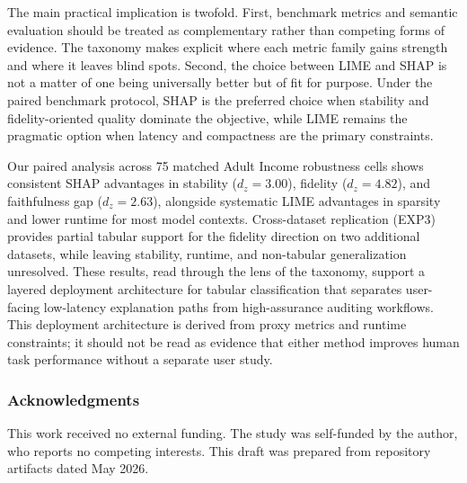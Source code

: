 \documentclass[10pt]{article}
\makeatletter
\newcommand{\ifdeanon}[2]{\if@accepted#1\else#2\fi}
\newcommand{\acks}[1]{\subsubsection*{Acknowledgments}#1}
\makeatother
\begin{document}
The main practical implication is twofold. First, benchmark metrics and
semantic evaluation should be treated as complementary rather than
competing forms of evidence. The taxonomy makes explicit where each
metric family gains strength and where it leaves blind spots. Second, the
choice between LIME and SHAP is not a matter of one being universally
better but of fit for purpose. Under the paired benchmark protocol, SHAP
is the preferred choice when stability and fidelity-oriented quality
dominate the objective, while LIME remains the pragmatic option when
latency and compactness are the primary constraints.

Our paired analysis across 75 matched Adult Income robustness cells shows
consistent SHAP advantages in stability ($d_z = 3.00$), fidelity
($d_z = 4.82$), and faithfulness gap ($d_z = 2.63$), alongside systematic
LIME advantages in sparsity and lower runtime for most model contexts.
Cross-dataset replication (EXP3) provides partial tabular support for the
fidelity direction on two additional datasets, while leaving stability,
runtime, and non-tabular generalization unresolved. These results, read
through the lens of the taxonomy, support a layered deployment
architecture for tabular classification that separates user-facing
low-latency explanation paths from high-assurance auditing workflows. This
deployment architecture is derived from proxy metrics and runtime
constraints; it should not be read as evidence that either method improves
human task performance without a separate user study.

\ifdeanon{%
\acks{This work received no external funding. The study was self-funded by
the author, who reports no competing interests. This draft was
prepared from repository artifacts dated May 2026.}%
}{}
\end{document}
